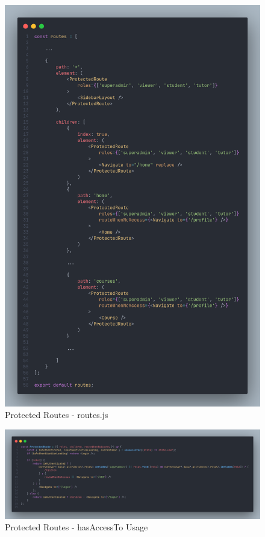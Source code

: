 \begin{justify}
        \begin{figure}[H]
            \centerline{\includegraphics[width=150mm,scale=1]{figures/implementation_and_testing/implementation/frontend/private_routes.png}}
            \caption{Protected Routes - routes.js}
        \end{figure}

        \begin{figure}[H]
            \centerline{\includegraphics[width=150mm,scale=1]{figures/implementation_and_testing/implementation/frontend/protected_routes.png}}
            \caption{Protected Routes - hasAccessTo Usage}
        \end{figure}


\end{justify}
